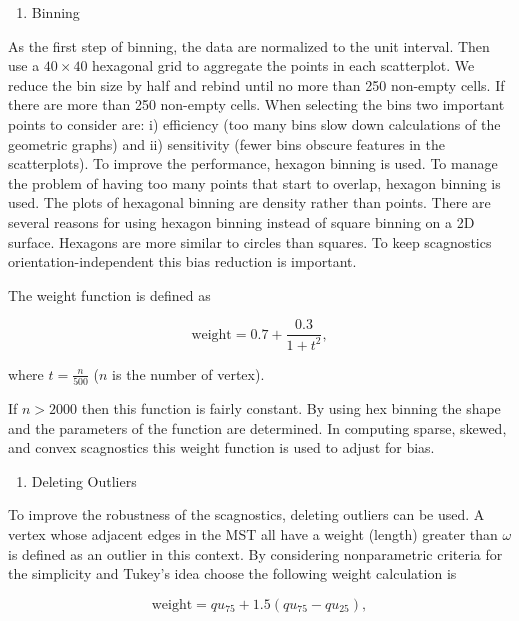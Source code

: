 \documentclass{article}
\newcommand{\tightlist}{%
\setlength{\itemsep}{0pt}\setlength{\parskip}{0pt}}
\begin{document}
\begin{enumerate}
\def\labelenumi{\roman{enumi})}
\tightlist
\item
  Binning
\end{enumerate}

As the first step of binning, the data are normalized to the unit
interval. Then use a \(40 \times 40\) hexagonal grid to aggregate the
points in each scatterplot. We reduce the bin size by half and rebind
until no more than 250 non-empty cells. If there are more than 250
non-empty cells. When selecting the bins two important points to
consider are: i) efficiency (too many bins slow down calculations of the
geometric graphs) and ii) sensitivity (fewer bins obscure features in
the scatterplots). To improve the performance, hexagon binning is used.
To manage the problem of having too many points that start to overlap,
hexagon binning is used. The plots of hexagonal binning are density
rather than points. There are several reasons for using hexagon binning
instead of square binning on a 2D surface. Hexagons are more similar to
circles than squares. To keep scagnostics orientation-independent this
bias reduction is important.

The weight function is defined as

\begin{equation}
    \text{weight} = 0.7 + \frac{0.3}{1 + t^2},
    \label{w2}
\end{equation}

where \(t=\frac{n}{500}\) (\(n\) is the number of vertex).

If \(n > 2000\) then this function is fairly constant. By using
hex binning the shape and the parameters of the function are determined.
In computing sparse, skewed, and convex scagnostics this weight function
is used to adjust for bias.

\begin{enumerate}
\def\labelenumi{\roman{enumi})}
\setcounter{enumi}{1}
\tightlist
\item
  Deleting Outliers
\end{enumerate}

To improve the robustness of the scagnostics, deleting outliers can be
used. A vertex whose adjacent edges in the MST all have a weight
(length) greater than \(\omega\) is defined as an outlier in this
context. By considering nonparametric criteria for the simplicity and
Tukey's idea choose the following weight calculation is

\begin{equation}
    \text{weight} = qu_{75} + 1.5(qu_{75} - qu_{25}),
    \label{w1}
\end{equation}
\end{document}
